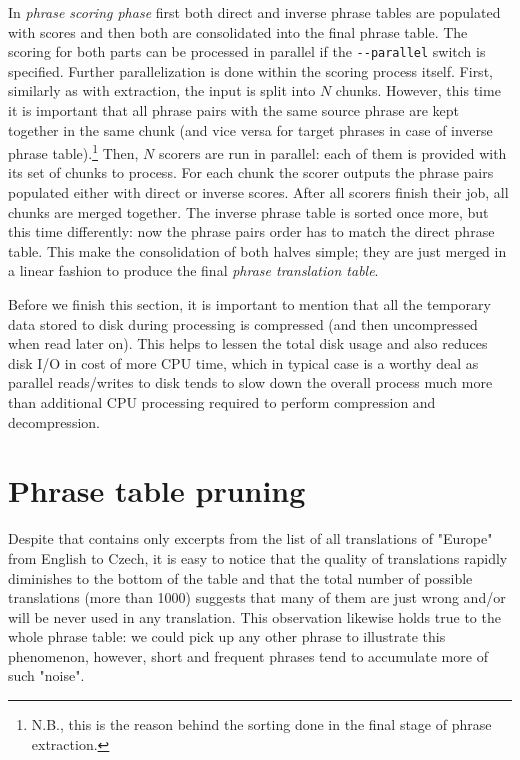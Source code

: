 In \emph{phrase scoring phase} first both direct and inverse phrase tables are
populated with scores and then both are consolidated into the final phrase table.
The scoring for both parts can be processed in parallel if the \verb|--parallel|
switch is specified.
Further parallelization is done within the scoring process itself.
First, similarly as with extraction, the input is split into $N$ chunks.
However, this time it is important that all phrase pairs with the same source
phrase are kept together in the same chunk (and vice versa for target phrases
in case of inverse phrase table).\footnote{N.B., this is the reason behind
the sorting done in the final stage of phrase extraction.}
Then, $N$ scorers are run in parallel: each of them is provided with its set
of chunks to process.
For each chunk the scorer outputs the phrase pairs populated either with direct
or inverse scores.
After all scorers finish their job, all chunks are merged together.
The inverse phrase table is sorted once more, but this time differently:
now the phrase pairs order has to match the direct phrase table.
This make the consolidation of both halves simple; they are just merged
in a linear fashion to produce the final \emph{phrase translation table}.

Before we finish this section, it is important to mention that all
the temporary data stored to disk during processing is compressed
(and then uncompressed when read later on).
This helps to lessen the total disk usage and also reduces disk I/O in cost of
more CPU time, which in typical case is a worthy deal as parallel reads/writes
to disk tends to slow down the overall process much more than additional
CPU processing required to perform compression and decompression.

\section{Phrase table pruning}
\label{sec:phrase-table-pruning}

Despite that  contains only excerpts from the list
of all translations of "Europe" from English to Czech, it is easy to notice
that the quality of translations rapidly diminishes to the bottom of the table
and that the total number of possible translations (more than 1000) suggests
that many of them are just wrong and/or will be never used in any translation.
This observation likewise holds true to the whole phrase table: we could pick up
any other phrase to illustrate this phenomenon, however, short and frequent
phrases tend to accumulate more of such "noise".

